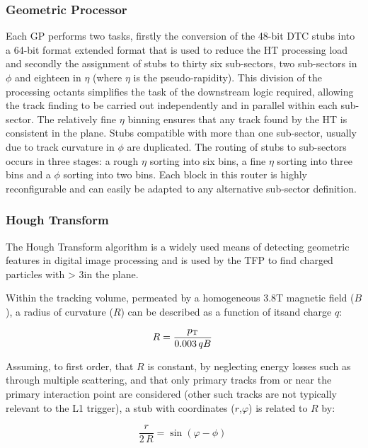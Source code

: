 \subsubsection{Geometric Processor}\label{subsubsec:GP}
Each GP performs two tasks, firstly the conversion of the 48-bit DTC stubs into a 64-bit format extended format that is used to reduce the HT processing load and secondly the assignment of stubs to thirty six sub-sectors, two sub-sectors in $\phi$ and eighteen in $\eta$ (where $\eta$ is the pseudo-rapidity). 
This division of the processing octants simplifies the task of the downstream logic required, allowing the track finding to be carried out independently and in parallel within each sub-sector. 
The relatively fine $\eta$ binning ensures that any track found by the \rphi HT is consistent in the \rz plane. Stubs compatible with more than one sub-sector, usually due to track curvature in $\phi$ are duplicated. 
The routing of stubs to sub-sectors occurs in three stages: a rough $\eta$ sorting into six bins, a fine $\eta$ sorting into three bins and a $\phi$ sorting into two bins. 
Each block in this router is highly reconfigurable and can easily be adapted to any alternative sub-sector definition.

\subsubsection{Hough Transform}
The Hough Transform algorithm is a widely used means of detecting geometric features in digital image processing \cite{HT} and is used by the TFP to find charged particles with \pT > 3\GeV in the \rphi plane. 

Within the tracking volume, permeated by a homogeneous 3.8T magnetic field ($B$), a radius of curvature ($R$) can be described as a function of its\pT and charge $q$:

\begin{equation}
R = \frac{p_{\mathrm{T}}}{0.003\,qB} \;
\label{eq:R}
\end{equation}

Assuming, to first order, that $R$ is constant, by neglecting energy losses such as through multiple scattering, and that only primary tracks from or near the primary interaction point are considered (other such tracks are not typically relevant to the L1 trigger), a stub with coordinates ($r$,$\varphi$) is related to $R$ by:

\begin{equation}
\frac r{2\,R} = \sin\left(\varphi-\phi\right) \;
\label{eq:stub_R}
\end{equation}

